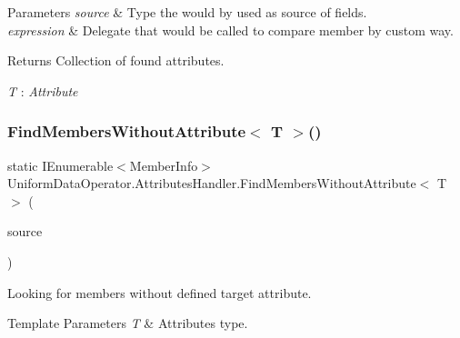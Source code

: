 \begin{DoxyParams}{Parameters}
{\em source} & Type the would by used as source of fields.\\
\hline
{\em expression} & Delegate that would be called to compare member by custom way.\\
\hline
\end{DoxyParams}
\begin{DoxyReturn}{Returns}
Collection of found attributes.
\end{DoxyReturn}
\begin{Desc}
\item[Type Constraints]\begin{description}
\item[{\em T} : {\em Attribute}]\end{description}
\end{Desc}
\mbox{\label{class_uniform_data_operator_1_1_attributes_handler_a0a4cca8daa161032ea820531b35695d7}} 
\subsubsection{\texorpdfstring{Find\+Members\+Without\+Attribute$<$ T $>$()}{FindMembersWithoutAttribute< T >()}\hspace{0.1cm}{\footnotesize\ttfamily [2/2]}}
{\footnotesize\ttfamily static I\+Enumerable$<$Member\+Info$>$ Uniform\+Data\+Operator.\+Attributes\+Handler.\+Find\+Members\+Without\+Attribute$<$ T $>$ (\begin{DoxyParamCaption}\item[{I\+Enumerable$<$ Member\+Info $>$}]{source }\end{DoxyParamCaption})\hspace{0.3cm}{\ttfamily [static]}}



Looking for members without defined target attribute. 


\begin{DoxyTemplParams}{Template Parameters}
{\em T} & Attribute\textquotesingle{}s type.\\
\hline
\end{DoxyTemplParams}

